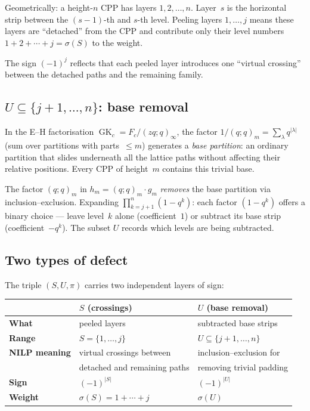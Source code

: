 \documentclass[11pt]{article}
\newcommand{\GK}{\operatorname{GK}}
\newcommand{\qpoch}[2]{(#1;#2)_\infty}
\newcommand{\qpochn}[3]{(#1;#2)_{#3}}
\theoremstyle{plain}
\theoremstyle{definition}
\begin{document}
Geometrically: a height-$n$ CPP has layers
$1, 2, \ldots, n$.  Layer~$s$ is the horizontal strip
between the $(s{-}1)$-th and $s$-th level.  Peeling
layers $1, \ldots, j$ means these layers are ``detached''
from the CPP and contribute only their level numbers
$1 + 2 + \cdots + j = \sigma(S)$ to the weight.

The sign $(-1)^j$ reflects that each peeled layer
introduces one ``virtual crossing'' between the
detached paths and the remaining family.

\subsection*{$U \subseteq \{j+1, \ldots, n\}$: base removal}

In the E--H factorisation
$\GK_c = F_c / \qpoch{zq}{q}$, the factor
$1/\qpochn{q}{q}{m} = \sum_\lambda q^{|\lambda|}$ (sum
over partitions with parts~$\leq m$) generates a
\emph{base partition}: an ordinary partition that slides
underneath all the lattice paths without affecting their
relative positions.  Every CPP of height~$m$ contains
this trivial base.

The factor $\qpochn{q}{q}{m}$ in
$h_m = \qpochn{q}{q}{m} \cdot g_m$ \emph{removes} the
base partition via inclusion--exclusion.  Expanding
$\prod_{k=j+1}^n (1 - q^k)$: each factor $(1 - q^k)$
offers a binary choice --- leave level~$k$ alone
(coefficient~$1$) or subtract its base strip
(coefficient~$-q^k$).  The subset $U$ records which
levels are being subtracted.

\subsection*{Two types of defect}

The triple $(S, U, \pi)$ carries two independent layers
of sign:

\medskip
\begin{center}
\begin{tabular}{l|l|l}
  & \textbf{$S$ (crossings)} &
    \textbf{$U$ (base removal)} \\ \hline
  \textbf{What} &
    peeled layers &
    subtracted base strips \\
  \textbf{Range} &
    $S = \{1, \ldots, j\}$ &
    $U \subseteq \{j{+}1, \ldots, n\}$ \\
  \textbf{NILP meaning} &
    virtual crossings between &
    inclusion--exclusion for \\
  & detached and remaining paths &
    removing trivial padding \\
  \textbf{Sign} &
    $(-1)^{|S|}$ &
    $(-1)^{|U|}$ \\
  \textbf{Weight} &
    $\sigma(S) = 1 + \cdots + j$ &
    $\sigma(U)$
\end{tabular}
\end{center}
\end{document}
